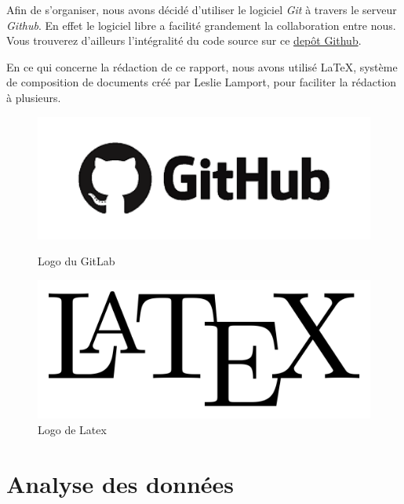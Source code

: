\documentclass[oneside,13pt,a4paper]{report}
\begin{document}
Afin de s'organiser, nous avons décidé d'utiliser le logiciel \textit{Git} à travers le serveur \textit{Github}. En effet le logiciel libre a facilité grandement la collaboration entre nous. Vous trouverez d'ailleurs l'intégralité du code source sur ce \href{https://github.com/massykezzoul/mtq-neural-networks}{depôt Github}.

En ce qui concerne la rédaction de ce rapport, nous avons utilisé \LaTeX, système de composition de documents créé par Leslie Lamport, pour faciliter la rédaction à plusieurs.

\begin{figure}[h]
	\begin{minipage}[c]{.46\linewidth}
		\centering
		\includegraphics[width=1\textwidth]{img/github.png}
		\caption{Logo du GitLab}
	\end{minipage}
	\hfill%
	\begin{minipage}[c]{.46\linewidth}
		\centering
		\includegraphics[width=1\textwidth]{img/latex.png}
		\caption{Logo de Latex}
	\end{minipage}
\end{figure}



\chapter{Analyse des données}
\end{document}
